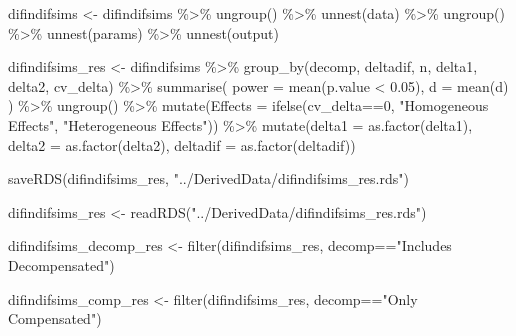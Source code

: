 \documentclass[
]{article}
\newenvironment{Shaded}{\begin{snugshade}}{\end{snugshade}}
\newcommand{\AttributeTok}[1]{\textcolor[rgb]{0.77,0.63,0.00}{#1}}
\newcommand{\DecValTok}[1]{\textcolor[rgb]{0.00,0.00,0.81}{#1}}
\newcommand{\FloatTok}[1]{\textcolor[rgb]{0.00,0.00,0.81}{#1}}
\newcommand{\FunctionTok}[1]{\textcolor[rgb]{0.00,0.00,0.00}{#1}}
\newcommand{\NormalTok}[1]{#1}
\newcommand{\OtherTok}[1]{\textcolor[rgb]{0.56,0.35,0.01}{#1}}
\newcommand{\SpecialCharTok}[1]{\textcolor[rgb]{0.00,0.00,0.00}{#1}}
\newcommand{\StringTok}[1]{\textcolor[rgb]{0.31,0.60,0.02}{#1}}
\begin{document}
\begin{Shaded}
\begin{Highlighting}[]
\NormalTok{difindifsims }\OtherTok{\textless{}{-}}\NormalTok{ difindifsims }\SpecialCharTok{\%\textgreater{}\%} 
  \FunctionTok{ungroup}\NormalTok{() }\SpecialCharTok{\%\textgreater{}\%} 
  \FunctionTok{unnest}\NormalTok{(data) }\SpecialCharTok{\%\textgreater{}\%} 
  \FunctionTok{ungroup}\NormalTok{() }\SpecialCharTok{\%\textgreater{}\%} 
  \FunctionTok{unnest}\NormalTok{(params) }\SpecialCharTok{\%\textgreater{}\%} 
  \FunctionTok{unnest}\NormalTok{(output)}

\NormalTok{difindifsims\_res }\OtherTok{\textless{}{-}}\NormalTok{ difindifsims }\SpecialCharTok{\%\textgreater{}\%} 
  \FunctionTok{group\_by}\NormalTok{(decomp, deltadif, n, delta1, delta2, cv\_delta) }\SpecialCharTok{\%\textgreater{}\%} 
  \FunctionTok{summarise}\NormalTok{(}
    \AttributeTok{power =} \FunctionTok{mean}\NormalTok{(p.value }\SpecialCharTok{\textless{}} \FloatTok{0.05}\NormalTok{),}
    \AttributeTok{d =} \FunctionTok{mean}\NormalTok{(d)}
\NormalTok{  ) }\SpecialCharTok{\%\textgreater{}\%} 
  \FunctionTok{ungroup}\NormalTok{() }\SpecialCharTok{\%\textgreater{}\%} 
  \FunctionTok{mutate}\NormalTok{(}\AttributeTok{Effects =} \FunctionTok{ifelse}\NormalTok{(cv\_delta}\SpecialCharTok{==}\DecValTok{0}\NormalTok{, }\StringTok{"Homogeneous Effects"}\NormalTok{, }
                                        \StringTok{"Heterogeneous Effects"}\NormalTok{)) }\SpecialCharTok{\%\textgreater{}\%} 
  \FunctionTok{mutate}\NormalTok{(}\AttributeTok{delta1 =} \FunctionTok{as.factor}\NormalTok{(delta1),}
         \AttributeTok{delta2 =} \FunctionTok{as.factor}\NormalTok{(delta2),}
         \AttributeTok{deltadif =} \FunctionTok{as.factor}\NormalTok{(deltadif))}

\FunctionTok{saveRDS}\NormalTok{(difindifsims\_res, }\StringTok{"../DerivedData/difindifsims\_res.rds"}\NormalTok{)}
\end{Highlighting}
\end{Shaded}

\begin{Shaded}
\begin{Highlighting}[]
\NormalTok{difindifsims\_res }\OtherTok{\textless{}{-}} \FunctionTok{readRDS}\NormalTok{(}\StringTok{"../DerivedData/difindifsims\_res.rds"}\NormalTok{)}

\NormalTok{difindifsims\_decomp\_res }\OtherTok{\textless{}{-}} \FunctionTok{filter}\NormalTok{(difindifsims\_res, }
\NormalTok{                                  decomp}\SpecialCharTok{==}\StringTok{"Includes Decompensated"}\NormalTok{)}

\NormalTok{difindifsims\_comp\_res }\OtherTok{\textless{}{-}} \FunctionTok{filter}\NormalTok{(difindifsims\_res, }
\NormalTok{                                  decomp}\SpecialCharTok{==}\StringTok{"Only Compensated"}\NormalTok{)}
\end{Highlighting}
\end{Shaded}
\end{document}
